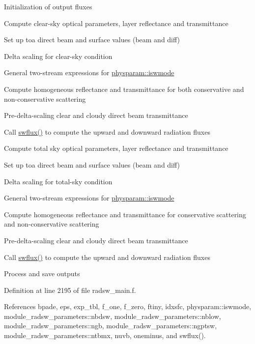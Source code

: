 \begin{DoxyEnumerate}
\item Initialization of output fluxes
\item Compute clear-\/sky optical parameters, layer reflectance and transmittance
\begin{DoxyItemize}
\item Set up toa direct beam and surface values (beam and diff)
\item Delta scaling for clear-\/sky condition
\item General two-\/stream expressions for \hyperlink{namespacephysparam_afe7d9a3a1e3cd4711675252a0921853b}{physparam\+::iswmode}
\item Compute homogeneous reflectance and transmittance for both conservative and non-\/conservative scattering
\item Pre-\/delta-\/scaling clear and cloudy direct beam transmittance
\item Call \hyperlink{namespacemodule__radsw__main_a138ee8c91089737c432cf70dbd8a8fae}{swflux()} to compute the upward and downward radiation fluxes
\end{DoxyItemize}
\item Compute total sky optical parameters, layer reflectance and transmittance
\begin{DoxyItemize}
\item Set up toa direct beam and surface values (beam and diff)
\item Delta scaling for total-\/sky condition
\item General two-\/stream expressions for \hyperlink{namespacephysparam_afe7d9a3a1e3cd4711675252a0921853b}{physparam\+::iswmode}
\item Compute homogeneous reflectance and transmittance for conservative scattering and non-\/conservative scattering
\item Pre-\/delta-\/scaling clear and cloudy direct beam transmittance
\item Call \hyperlink{namespacemodule__radsw__main_a138ee8c91089737c432cf70dbd8a8fae}{swflux()} to compute the upward and downward radiation fluxes
\end{DoxyItemize}
\item Process and save outputs 
\end{DoxyEnumerate}

Definition at line 2195 of file radsw\+\_\+main.\+f.



References bpade, eps, exp\+\_\+tbl, f\+\_\+one, f\+\_\+zero, ftiny, idxsfc, physparam\+::iswmode, module\+\_\+radsw\+\_\+parameters\+::nbdsw, module\+\_\+radsw\+\_\+parameters\+::nblow, module\+\_\+radsw\+\_\+parameters\+::ngb, module\+\_\+radsw\+\_\+parameters\+::ngptsw, module\+\_\+radsw\+\_\+parameters\+::ntbmx, nuvb, oneminus, and swflux().



